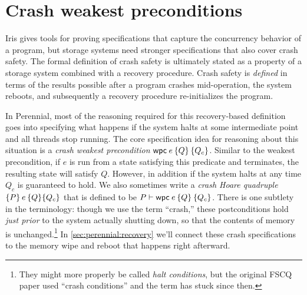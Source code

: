 \section{Crash weakest preconditions}
\label{sec:perennial:wpc}

\newcommand{\propc}{P_c}
\newcommand{\propcB}{Q_c}
\newcommand{\propcC}{R_c}

\newcommand{\wpcseqfig}{%
\begin{mathpar}
\inferH{wpc-value}
{}{\propc \land [\val/\var]\prop \proves \wpc{\val}{\Ret\var \prop}{\propc}}

\inferH{wpc-mono}
{\forall \val.\,\left([\val/\var]\prop \proves [\val/\var]\propB\right) \and
\propc \proves \propcB}
{\wpc\expr{\Ret\var \prop}{\propc} \proves \wpc\expr{\Ret\var \propB}{\propcB}}


\inferH{wpc-let}
{}
{\wpc{e_1}{ %
    \Ret{v} \wpc{\subst{e_2}{x}{v}}{\prop}{\propc} %
}{\propc} \proves
\wpc{\gooselet{x}{e_1}{e_2}}{\prop}{\propc}}

\end{mathpar}
}

Iris gives tools for proving specifications that capture the concurrency
behavior of a program, but storage systems need stronger specifications that
also cover crash safety. The formal definition of crash safety is ultimately
stated as a property of a storage system combined with a recovery procedure.
Crash safety is \emph{defined} in terms of the results possible after a program
crashes mid-operation, the system reboots, and subsequently a recovery procedure
re-initializes the program.

In Perennial, most of the reasoning required for this recovery-based definition
goes into specifying what happens if the system halts at some intermediate point
and all threads stop running. The core specification idea for reasoning about
this situation is a \emph{crash weakest precondition} $\wpc{e}{Q}{Q_{c}}$. Similar
to the weakest precondition, if $e$ is run from a state satisfying this
predicate and terminates, the resulting state will satisfy $Q$. However, in
addition if the system halts at any time $Q_{c}$ is guaranteed to hold. We also
sometimes write a \emph{crash Hoare quadruple} $\hoareC{P}{e}{Q}{Q_{c}}$ that is
defined to be $P \proves \wpc{e}{Q}{Q_{c}}$. There is one subtlety in the
terminology: though we use the term ``crash,'' these postconditions hold
\emph{just prior} to the system actually shutting down, so that the contents of
memory is unchanged.\footnote{They might more properly be called \emph{halt
conditions}, but the original FSCQ paper used ``crash conditions'' and the term has
stuck since then.} In \cref{sec:perennial:recovery} we'll connect these
crash specifications to the memory wipe and reboot that happens right afterward.

